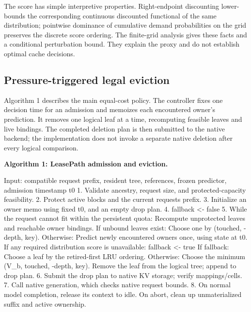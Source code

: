 \documentclass[sigconf, screen, review]{acmart}
\newenvironment{Shaded}{}{}
\providecommand{\NormalTok}[1]{#1}
\begin{document}
The score has simple interpretive properties. Right-endpoint discounting
lower-bounds the corresponding continuous discounted functional of the
same distribution; pointwise dominance of cumulative demand
probabilities on the grid preserves the discrete score ordering.
The finite-grid analysis gives these facts and a conditional perturbation bound. They
explain the proxy and do not establish optimal cache decisions.

\subsection{Pressure-triggered legal
eviction}\label{pressure-triggered-legal-eviction}

Algorithm 1 describes the main equal-cost policy. The controller fixes
one decision time for an admission and memoizes each encountered owner's
prediction. It removes one logical leaf at a time, recomputing feasible
leaves and live bindings. The completed deletion plan is then submitted
to the native backend; the implementation does not invoke a separate
native deletion after every logical comparison.


\textbf{Algorithm 1: LeasePath admission and eviction.}

\begin{Shaded}
\begin{Highlighting}[]
\NormalTok{Input: compatible request prefix, resident tree, references,}
\NormalTok{       frozen predictor, admission timestamp t0}
\NormalTok{1. Validate ancestry, request size, and protected{-}capacity feasibility.}
\NormalTok{2. Protect active blocks and the current request\textquotesingle{}s prefix.}
\NormalTok{3. Initialize an owner memo using fixed t0, and an empty drop plan.}
\NormalTok{4. fallback \textless{}{-} false}
\NormalTok{5. While the request cannot fit within the persistent quota:}
\NormalTok{     Recompute unprotected leaves and reachable owner bindings.}
\NormalTok{     If unbound leaves exist:}
\NormalTok{         Choose one by (touched, {-}depth, key).}
\NormalTok{     Otherwise:}
\NormalTok{         Predict newly encountered owners once, using state at t0.}
\NormalTok{         If any required distribution score is unavailable:}
\NormalTok{             fallback \textless{}{-} true}
\NormalTok{         If fallback:}
\NormalTok{             Choose a leaf by the retired{-}first LRU ordering.}
\NormalTok{         Otherwise:}
\NormalTok{             Choose the minimum (V\_b, touched, {-}depth, key).}
\NormalTok{     Remove the leaf from the logical tree; append to drop plan.}
\NormalTok{6. Submit the drop plan to native KV storage; verify mappings/cells.}
\NormalTok{7. Call native generation, which checks native request bounds.}
\NormalTok{8. On normal model completion, release its context to idle.}
\NormalTok{   On abort, clean up unmaterialized suffix and active ownership.}
\end{Highlighting}
\end{Shaded}
\end{document}
